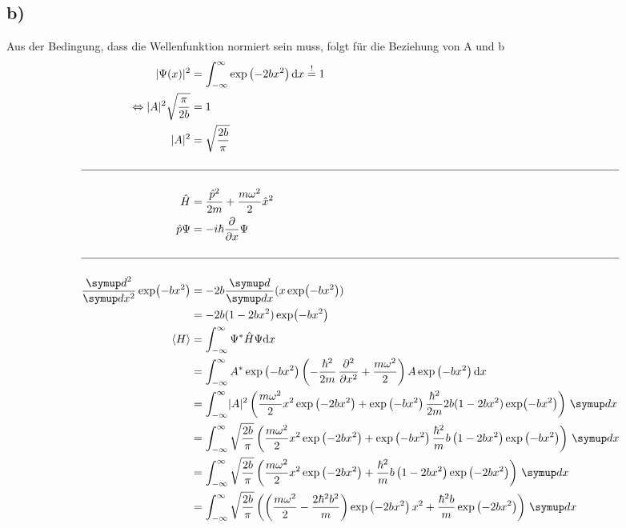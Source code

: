 \subsection{b)}
    Aus der Bedingung, dass die Wellenfunktion normiert sein muss, folgt für die Beziehung von A und b
    \begin{align}
        \abs{\Psi(x)}^2 &= \int_{-\infty}^{\infty} \exp\left( -2bx^2 \right) \mathrm{d}x \stackrel{!}{=} 1\\
        \Leftrightarrow \abs{A}^2 \sqrt{\frac{\pi}{2b}} &= 1\\
        \abs{A}^2 &= \sqrt{\frac{2b}{\pi}}\\
        \nonumber\\
        \hline \nonumber \\
        \hat{H} &= \frac{\hat{p}^2}{2m} + \frac{m\omega^2}{2}\hat{x}^2\\
        \hat{p} \Psi &= -i\hbar \frac{\partial}{\partial x} \Psi\\
        \nonumber\\
        \hline \nonumber \\
        \frac{\dif{}^2}{\dif{x^2}} \exp(-bx^2) &= -2b \frac{\dif{}}{\dif{x}}(x \exp(-bx^2))\\
        &= -2b (1-2bx^2) \exp (-bx^2)\nonumber \\
        \langle H \rangle &= \int_{-\infty}^{\infty} \Psi^* \hat{H} \Psi \mathrm{d}x\\
        &= \int_{-\infty}^{\infty} A^* \exp\left( -bx^2 \right) \left( -\frac{\hbar^2}{2m} \deln{}{x}{2} + \frac{m\omega^2}{2} \right) A \exp\left( -bx^2 \right) \mathrm{d}x\\
        &= \int_{-\infty}^{\infty} \abs{A}^2 \left( \frac{m\omega^2}{2} x^2 \exp\left( -2bx^2 \right) + \exp\left( -bx^2 \right) \frac{\hbar^2}{2m} 2b (1-2bx^2) \exp (-bx^2) \right) \,\dif{x}\\
        &= \int_{-\infty}^{\infty} \sqrt{\frac{2b}{\pi}} \left( \frac{m\omega^2}{2} x^2 \exp\left( -2bx^2 \right) + \exp\left( -bx^2 \right) \frac{\hbar^2}{m} b \left( 1-2bx^2 \right) \exp\left( -bx^2 \right) \right) \,\dif{x}\\
        &= \int_{-\infty}^{\infty} \sqrt{\frac{2b}{\pi}} \left( \frac{m\omega^2}{2} x^2 \exp\left( -2bx^2 \right) + \frac{\hbar^2}{m} b \left( 1-2bx^2 \right) \exp\left( -2bx^2 \right) \right) \,\dif{x}\\
        &= \int_{-\infty}^{\infty} \sqrt{\frac{2b}{\pi}} \left( \left( \frac{m\omega^2}{2} - \frac{2\hbar^2 b^2}{m} \right) \exp\left( -2bx^2 \right) x^2 + \frac{\hbar^2 b}{m} \exp\left( -2bx^2 \right) \right) \,\dif{x}\\

\end{align}
